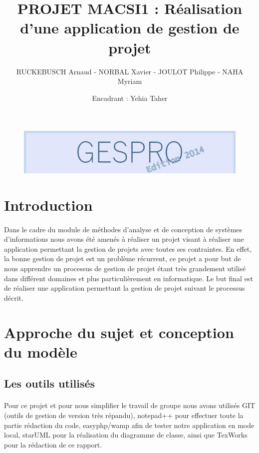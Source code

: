 \documentclass[a4paper, 12pt]{article}
\title{PROJET MACSI1 : Réalisation d'une application de gestion de projet }
\author{RUCKEBUSCH Arnaud - NORBAL Xavier - JOULOT Philippe - NAHA Myriam}
\date{Encadrant : Yehia Taher}
\makeatletter
\def\maketitle{
  \null
  \thispagestyle{empty}
  \vfill
  \begin{center}\leavevmode
    \normalfont
    {\LARGE \@title\par}
    \vskip 1cm
    {\Large \@author\par}
    \vskip 1cm
    {\Large \@date\par}
  \end{center}
  \vfill
  \null
  \cleardoublepage
  }
\makeatother
\begin{document}
\begin{figure}[h!]
	\includegraphics[width=1\textwidth]{GESPRO2014.png}
\end{figure}
\maketitle

\setcounter{page}{1}
\tableofcontents
\newpage

\section{Introduction}
\paragraph{}Dans le cadre du module de méthodes d’analyse et de conception de systèmes d’informations nous avons été amenés à réaliser un projet visant à réaliser une application permettant la gestion de projets avec toutes ses contraintes. En effet, la  bonne gestion de projet est un problème récurrent, ce projet a pour but de nous apprendre un processus de gestion de projet étant très grandement utilisé dans différent domaines et plus particulièrement en informatique. Le but final est de réaliser une application permettant la gestion de projet suivant le processus décrit.

\newpage

\section{Approche du sujet et conception du modèle}

\subsection{Les outils utilisés}
\paragraph{}Pour ce projet et pour nous simplifier le travail de groupe nous avons utilisés GIT (outils de gestion de version très répandu), notepad++ pour effectuer toute la partie rédaction du code, easyphp/wamp afin de tester notre application en mode local, starUML pour la réalisation du diagramme de classe, ainsi que TexWorks pour la rédaction de ce rapport.
\end{document}
